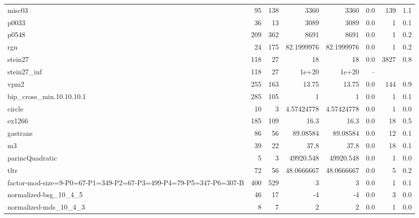 \documentclass[leqno]{article}
\begin{document}
\begin{center}
\begin{supertabular*}{\textwidth}{@{\extracolsep{\fill}}lrrrrrrr@{}}
misc03             &     95 &    138 &             3360 &             3360 &    0.0 &       139 &      1.1\\
p0033              &     36 &     13 &             3089 &             3089 &    0.0 &         1 &      0.1\\
p0548              &    209 &    362 &             8691 &             8691 &    0.0 &         1 &      0.2\\
rgn                &     24 &    175 &       82.1999976 &       82.1999976 &    0.0 &         1 &      0.2\\
stein27            &    118 &     27 &               18 &               18 &    0.0 &      3827 &      0.8\\
stein27\_inf       &    118 &     27 &            1e+20 &            1e+20 &   --   & &\\
vpm2               &    255 &    163 &            13.75 &            13.75 &    0.0 &       144 &      0.9\\
bip\_cross\_min.10.10.10.1 &    285 &    105 &                1 &                1 &    0.0 &         1 &      0.1\\
circle             &     10 &      3 &       4.57424778 &       4.57424778 &    0.0 &         1 &      0.0\\
ex1266             &    185 &    109 &             16.3 &             16.3 &    0.0 &        18 &      0.5\\
gastrans           &     86 &     56 &         89.08584 &         89.08584 &    0.0 &        12 &      0.1\\
m3                 &     39 &     22 &             37.8 &             37.8 &    0.0 &        18 &      0.1\\
parincQuadratic    &      5 &      3 &        49920.548 &        49920.548 &    0.0 &         1 &      0.0\\
tltr               &     72 &     56 &       48.0666667 &       48.0666667 &    0.0 &         5 &      0.2\\
factor-mod-size=9-P0=67-P1=349-P2=67-P3=499-P4=79-P5=347-P6=307-B &    400 &    529 &                3 &                3 &    0.0 &         1 &      0.1\\
normalized-bsg\_10\_4\_5 &     46 &     17 &               -4 &               -4 &    0.0 &         3 &      0.0\\
normalized-mds\_10\_4\_3 &      8 &      7 &                2 &                2 &    0.0 &         1 &      0.0\\

\end{supertabular*}
\end{center}
\end{document}
